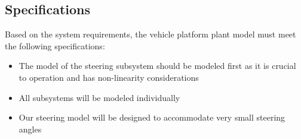 \documentclass[letterpaper,12pt]{article}   %
\begin{document}
 \subsection{Specifications}
 Based on the system requirements, the vehicle platform plant model must meet the following specifications:
 \begin{itemize}
    \item The model of the steering subsystem should be modeled first as it is crucial to operation and has non-linearity considerations
    \item All subsystems will be modeled individually 
    \item Our steering model will be designed to accommodate very small steering angles
 \end{itemize}









\end{document}
